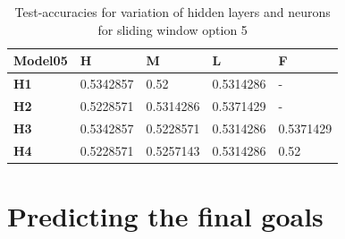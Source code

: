 \begin{table}
\centering
\begin{tabular}{|l|l|l|l|l|}
\hline

\textbf{Model05} & \textbf{H} & \textbf{M} & \textbf{L} & \textbf{F} \\ \hline
\textbf{H1} & 0.5342857 & 0.52 & 0.5314286 & - \\ \hline
\textbf{H2} & 0.5228571 & 0.5314286 & 0.5371429 & - \\ \hline
\textbf{H3} & 0.5342857 & 0.5228571 & 0.5314286 & 0.5371429 \\ \hline
\textbf{H4} & 0.5228571 & 0.5257143 & 0.5314286 & 0.52 \\ \hline

\end{tabular}
\caption{Test-accuracies for variation of hidden layers and neurons for sliding window option 5}
\label{table:nn_variation_sliding_05}
\end{table}

\section{Predicting the final goals}
